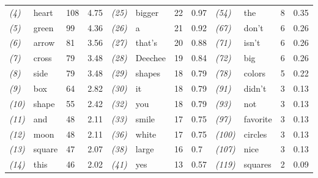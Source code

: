 \begin{screenonly}
\begin{table*}[h]
\begin{tabular*}{\hsize}{@{\extracolsep{\fill}}llllllllllll}
    \textsl{(4)} & heart & 108 & 4.75 & \hspace*{2ex}\textsl{(25)} & bigger & 22 & 0.97 & \hspace*{2ex}\textsl{(54)} & the & 8 & 0.35 \\
    \textsl{(5)} & green & 99 & 4.36 & \hspace*{2ex}\textsl{(26)} & a & 21 & 0.92 & \hspace*{2ex}\textsl{(67)} & don't & 6 & 0.26 \\
    \textsl{(6)} & arrow & 81 & 3.56 & \hspace*{2ex}\textsl{(27)} & that's & 20 & 0.88 & \hspace*{2ex}\textsl{(71)} & isn't & 6 & 0.26 \\
    \textsl{(7)} & cross & 79 & 3.48 & \hspace*{2ex}\textsl{(28)} & Deechee & 19 & 0.84 & \hspace*{2ex}\textsl{(72)} & big & 6 & 0.26 \\
    \textsl{(8)} & side & 79 & 3.48 & \hspace*{2ex}\textsl{(29)} & shapes & 18 & 0.79 & \hspace*{2ex}\textsl{(78)} & colors & 5 & 0.22 \\
    \textsl{(9)} & box & 64 & 2.82 & \hspace*{2ex}\textsl{(30)} & it & 18 & 0.79 & \hspace*{2ex}\textsl{(91)} & didn't & 3 & 0.13 \\
    \textsl{(10)} & shape & 55 & 2.42 & \hspace*{2ex}\textsl{(32)} & you & 18 & 0.79 & \hspace*{2ex}\textsl{(93)} & not & 3 & 0.13 \\
    \textsl{(11)} & and & 48 & 2.11 & \hspace*{2ex}\textsl{(33)} & smile & 17 & 0.75 & \hspace*{2ex}\textsl{(97)} & favorite & 3 & 0.13 \\
    \textsl{(12)} & moon & 48 & 2.11 & \hspace*{2ex}\textsl{(36)} & white & 17 & 0.75 & \hspace*{2ex}\textsl{(100)} & circles & 3 & 0.13 \\
    \textsl{(13)} & square & 47 & 2.07 & \hspace*{2ex}\textsl{(38)} & large & 16 & 0.7 & \hspace*{2ex}\textsl{(107)} & nice & 3 & 0.13 \\
    \textsl{(14)} & this & 46 & 2.02 & \hspace*{2ex}\textsl{(41)} & yes & 13 & 0.57 & \hspace*{2ex}\textsl{(119)} & squares & 2 & 0.09 \\

\end{tabular*}
\end{table*}
\end{screenonly}
